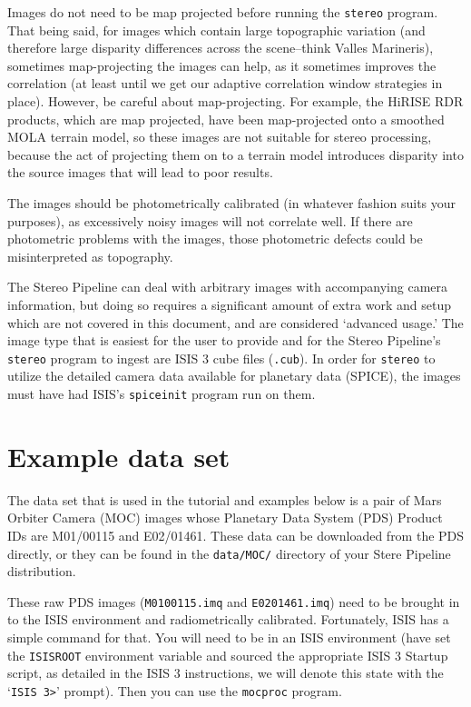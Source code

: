 Images do not need to be map projected before running the \texttt{stereo}
program. That being said, for images which contain large topographic
variation (and therefore large disparity differences across the
scene--think Valles Marineris), sometimes map-projecting the images
can help, as it sometimes improves the correlation (at least until
we get our adaptive correlation window strategies in place).  However,
be careful about map-projecting.  For example, the HiRISE RDR
products, which are map projected, have been map-projected onto a
smoothed MOLA terrain model, so these images are not suitable for
stereo processing, because the act of projecting them on to a terrain
model introduces disparity into the source images that will lead
to poor results.

The images should be photometrically calibrated (in whatever fashion
suits your purposes), as excessively noisy images will not correlate
well.  If there are photometric problems with the images, those
photometric defects could be misinterpreted as topography.

The Stereo Pipeline can deal with arbitrary images with accompanying
camera information, but doing so requires a significant amount of
extra work and setup which are not covered in this document, and
are considered `advanced usage.'  The image type that is easiest
for the user to provide and for the Stereo Pipeline's \texttt{stereo}
program to ingest are ISIS 3 cube files (\texttt{.cub}).  In order
for \texttt{stereo} to utilize the detailed camera data available
for planetary data (SPICE), the images must have had ISIS's
\texttt{spiceinit} program run on them.


\section{Example data set}

The data set that is used in the tutorial and examples below is a
pair of Mars Orbiter Camera (MOC)
\citep{1992JGR....97.7699M,2001JGR...10623429M} images whose Planetary
Data System (PDS) Product IDs are M01/00115 and E02/01461.
These data can be downloaded from the PDS directly, or they can be found in 
the \texttt{data/MOC/} directory of your Stere Pipeline distribution.

These raw PDS images (\texttt{M0100115.imq} and \texttt{E0201461.imq})
need to be brought in to the ISIS environment and radiometrically
calibrated.  Fortunately, ISIS has a simple command for that.  You
will need to be in an ISIS environment (have set the \texttt{ISISROOT}
environment variable and sourced the appropriate ISIS 3 Startup
script, as detailed in the ISIS 3 instructions, we will denote this
state with the `\texttt{ISIS 3>}' prompt).  Then you can use the
\texttt{mocproc} program.

